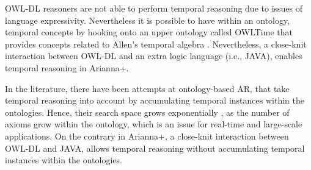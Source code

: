 \documentclass{thesisreport}
\begin{document}
  OWL-DL reasoners are not able to perform temporal reasoning due to issues of language expressivity. Nevertheless it is possible to have within an ontology, temporal concepts by hooking onto an upper ontology called OWLTime that provides concepts related to Allen’s temporal algebra \cite{kareem2018arianna}. Nevertheless, a close-knit interaction between OWL-DL and an extra logic language (i.e., JAVA), enables temporal reasoning in Arianna+.
  
  In the literature, there have been attempts \cite{scalmato2013describing,buoncompagni2017towards} at ontology-based AR, that take temporal reasoning into account by accumulating temporal instances within the ontologies. Hence, their search space grows exponentially \cite{salguero2018using}, as the number of axioms grow within the ontology, which is an issue for real-time and large-scale applications. On the contrary in Arianna+, a close-knit interaction between OWL-DL and JAVA, allows temporal reasoning without accumulating temporal instances within the ontologies.

 
\end{document}
